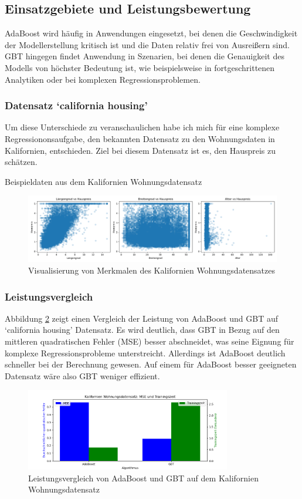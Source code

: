 \subsection{Einsatzgebiete und Leistungsbewertung}
AdaBoost wird häufig in Anwendungen eingesetzt, bei denen die Geschwindigkeit der Modellerstellung kritisch ist und die Daten relativ frei von Ausreißern sind. GBT hingegen findet Anwendung in Szenarien, bei denen die Genauigkeit des Modells von höchster Bedeutung ist, wie beispielsweise in fortgeschrittenen Analytiken oder bei komplexen Regressionsproblemen.

\subsubsection{Datensatz `california housing'}
Um diese Unterschiede zu veranschaulichen habe ich mich für eine komplexe Regressiononsaufgabe, den bekannten Datensatz zu den Wohnungsdaten in Kalifornien, entschieden. Ziel bei diesem Datensatz ist es, den Hauspreis zu schätzen.

\begin{table}[ht]
    \centering
    \caption{Beispieldaten aus dem Kalifornien Wohnungsdatensatz}
    \label{tab:housing_data}
    \resizebox{\textwidth}{!}{
    
    }
\end{table}
    

\begin{figure}[ht]
    \centering
    \includegraphics[width=\textwidth]{Images/housing_features.png}
    \caption{Visualisierung von Merkmalen des Kalifornien Wohnungsdatensatzes}
    \label{fig:housing_features}
\end{figure}

\subsubsection{Leistungsvergleich}
Abbildung \ref{fig:housing_performance} zeigt einen Vergleich der Leistung von AdaBoost und GBT auf `california housing' Datensatz. Es wird deutlich, dass GBT in Bezug auf den mittleren quadratischen Fehler (MSE) besser abschneidet, was seine Eignung für komplexe Regressionsprobleme unterstreicht. Allerdings ist AdaBoost deutlich schneller bei der Berechnung gewesen. Auf einem für AdaBoost besser geeigneten Datensatz wäre also GBT weniger effizient.

\begin{figure}[ht]
    \centering
    \includegraphics[width=0.8\textwidth]{Images/housing_performance.png}
    \caption{Leistungsvergleich von AdaBoost und GBT auf dem Kalifornien Wohnungsdatensatz}
    \label{fig:housing_performance}
\end{figure}
